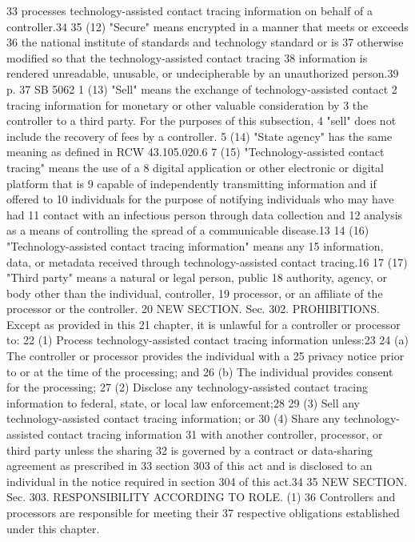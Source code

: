 33 processes technology-assisted contact tracing information on behalf
of a controller.34
35 (12) "Secure" means encrypted in a manner that meets or exceeds
36 the national institute of standards and technology standard or is
37 otherwise modified so that the technology-assisted contact tracing
38 information is rendered unreadable, unusable, or undecipherable by an
unauthorized person.39
p. 37 SB 5062
1 (13) "Sell" means the exchange of technology-assisted contact
2 tracing information for monetary or other valuable consideration by
3 the controller to a third party. For the purposes of this subsection,
4 "sell" does not include the recovery of fees by a controller.
5 (14) "State agency" has the same meaning as defined in RCW
43.105.020.6
7 (15) "Technology-assisted contact tracing" means the use of a
8 digital application or other electronic or digital platform that is
9 capable of independently transmitting information and if offered to
10 individuals for the purpose of notifying individuals who may have had
11 contact with an infectious person through data collection and
12 analysis as a means of controlling the spread of a communicable
disease.13
14 (16) "Technology-assisted contact tracing information" means any
15 information, data, or metadata received through technology-assisted
contact tracing.16
17 (17) "Third party" means a natural or legal person, public
18 authority, agency, or body other than the individual, controller,
19 processor, or an affiliate of the processor or the controller.
20 NEW SECTION. Sec. 302. PROHIBITIONS. Except as provided in this
21 chapter, it is unlawful for a controller or processor to:
22 (1) Process technology-assisted contact tracing information
unless:23
24 (a) The controller or processor provides the individual with a
25 privacy notice prior to or at the time of the processing; and
26 (b) The individual provides consent for the processing;
27 (2) Disclose any technology-assisted contact tracing information
to federal, state, or local law enforcement;28
29 (3) Sell any technology-assisted contact tracing information; or
30 (4) Share any technology-assisted contact tracing information
31 with another controller, processor, or third party unless the sharing
32 is governed by a contract or data-sharing agreement as prescribed in
33 section 303 of this act and is disclosed to an individual in the
notice required in section 304 of this act.34
35 NEW SECTION. Sec. 303. RESPONSIBILITY ACCORDING TO ROLE. (1)
36 Controllers and processors are responsible for meeting their
37 respective obligations established under this chapter.
